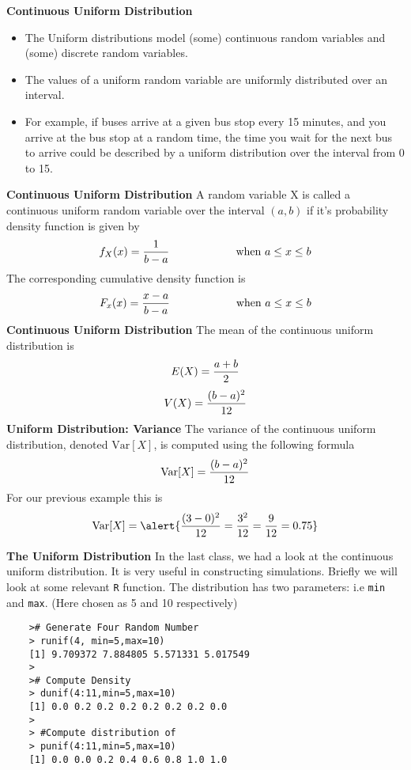 {
\textbf{Continuous Uniform Distribution} 
\begin{itemize}
\item 
The Uniform distributions model (some) continuous random variables and (some) discrete random variables. 
\item
The values of a uniform random variable are uniformly distributed over an interval. 
\item
For example, if buses arrive at a given bus stop every 15 minutes, and you arrive at the bus stop at a random time, the time you wait for the 
next bus to arrive could be described by a uniform distribution over the interval from 0 to 15.
\end{itemize}
 
}
{
\textbf{Continuous Uniform Distribution}
A random variable X is called a continuous uniform random variable over the interval $(a,b)$ if it's probability density function is given by
\[ f_{X}(x) = { 1 \over b-a} \hspace{2cm} \mbox{ when } a \leq x \leq b\]
The corresponding cumulative density function is
\[ F_x(x) = { x-a \over b-a} \hspace{2cm} \mbox{ when } a \leq x \leq b\]
}
{
\textbf{Continuous Uniform Distribution}
The mean of the continuous uniform distribution is
\[ E(X) = {a+b \over 2}\]
\[ V(X) = {(b-a)^2\over12}\]
}
{\textbf{Uniform Distribution: Variance}
\Large
The variance  of the continuous uniform distribution, denoted $\textrm{Var}[X]$,  is  computed using the following formula
\vspace{0.1cm}
\[
\textrm{Var}[X] = {(b - a)^2 \over 12}
\]
\vspace{0.1cm}
For our previous example this is
\[
\textrm{Var}[X] = \alert{{(3 - 0)^2 \over 12} =  {3^2 \over 12} = {9 \over 12} = 0.75}
\]
}

	\textbf{The Uniform Distribution}
	In the last class, we had a look at the continuous uniform distribution. It is very useful in constructing simulations. Briefly we will look at some relevant \texttt{R} function.
	The distribution has two parameters: i.e \texttt{min} and \texttt{max}. (Here chosen as 5 and 10 respectively)
	\begin{verbatim}
	># Generate Four Random Number
	> runif(4, min=5,max=10)
	[1] 9.709372 7.884805 5.571331 5.017549
	>
	># Compute Density
	> dunif(4:11,min=5,max=10)
	[1] 0.0 0.2 0.2 0.2 0.2 0.2 0.2 0.0
	>
	> #Compute distribution of
	> punif(4:11,min=5,max=10)
	[1] 0.0 0.0 0.2 0.4 0.6 0.8 1.0 1.0
	\end{verbatim}
	
\medskip



